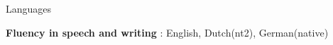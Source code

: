 \begin{cvskills}
{\begin{cvitems}
            \end{cvitems}
        }

    \cvskill
        { Languages }
        {
            \begin{cvitems}
                \item {\textbf{ Fluency in speech and writing }: English, Dutch(nt2), German(native)}
                
            \end{cvitems}
        }

\end{cvskills}